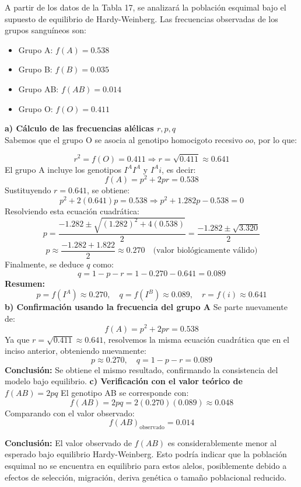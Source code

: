 \documentclass{article}
\begin{document}
A partir de los datos de la Tabla 17, se analizará la población esquimal bajo el supuesto de equilibrio de Hardy-Weinberg. Las frecuencias observadas de los grupos sanguíneos son:

\begin{itemize}
  \item Grupo A: \( f(A) = 0.538 \)
  \item Grupo B: \( f(B) = 0.035 \)
  \item Grupo AB: \( f(AB) = 0.014 \)
  \item Grupo O: \( f(O) = 0.411 \)
\end{itemize}

\textbf{a) Cálculo de las frecuencias alélicas \( r, p, q \)}\\

Sabemos que el grupo O se asocia al genotipo homocigoto recesivo \( oo \), por lo que:

\[r^2 = f(O) = 0.411 \Rightarrow r = \sqrt{0.411} \approx 0.641\]
El grupo A incluye los genotipos \( I^A I^A \) y \( I^A i \), es decir:
\[f(A) = p^2 + 2pr = 0.538\]
Sustituyendo \( r = 0.641 \), se obtiene:
\[p^2 + 2(0.641)p = 0.538 \Rightarrow p^2 + 1.282p - 0.538 = 0\]
Resolviendo esta ecuación cuadrática:
\[p = \frac{-1.282 \pm \sqrt{(1.282)^2 + 4(0.538)}}{2} = \frac{-1.282 \pm \sqrt{3.320}}{2}\]
\[p \approx \frac{-1.282 + 1.822}{2} \approx 0.270 \quad \text{(valor biológicamente válido)}\]
Finalmente, se deduce \( q \) como:
\[
q = 1 - p - r = 1 - 0.270 - 0.641 = 0.089\]
\vspace{0.5em}
\textbf{Resumen:}
\[
p = f(I^A) \approx 0.270, \quad q = f(I^B) \approx 0.089, \quad r = f(i) \approx 0.641\]
\textbf{b) Confirmación usando la frecuencia del grupo A}
Se parte nuevamente de:
\[f(A) = p^2 + 2pr = 0.538\]
Ya que \( r = \sqrt{0.411} \approx 0.641 \), resolvemos la misma ecuación cuadrática que en el inciso anterior, obteniendo nuevamente:
\[p \approx 0.270, \quad q = 1 - p - r = 0.089\]
\textbf{Conclusión:} Se obtiene el mismo resultado, confirmando la consistencia del modelo bajo equilibrio.
\textbf{c) Verificación con el valor teórico de \( f(AB) = 2pq \)}
El genotipo AB se corresponde con:
\[f(AB) = 2pq = 2(0.270)(0.089) \approx 0.048\]
Comparando con el valor observado:
\[f(AB)_{\text{observado}} = 0.014\]

\textbf{Conclusión:} El valor observado de \( f(AB) \) es considerablemente menor al esperado bajo equilibrio Hardy-Weinberg. Esto podría indicar que la población esquimal no se encuentra en equilibrio para estos alelos, posiblemente debido a efectos de selección, migración, deriva genética o tamaño poblacional reducido.
\end{document}
